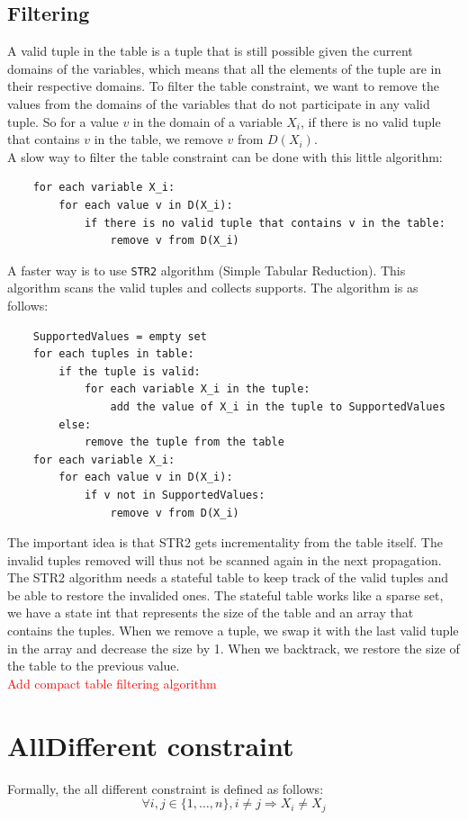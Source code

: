 \documentclass[12pt, openany]{report}
\theoremstyle{definition}
\begin{document}
\subsection{Filtering}
A valid tuple in the table is a tuple that is still possible given the current domains of the variables, which means that all the elements of the tuple are in their respective domains. To filter the table constraint, we want to remove the values from the domains of the variables that do not participate in any valid tuple. So for a value $v$ in the domain of a variable $X_i$, if there is no valid tuple that contains $v$ in the table, we remove $v$ from $D(X_i)$.\\
A slow way to filter the table constraint can be done with this little algorithm:
\begin{lstlisting}    
    for each variable X_i:
        for each value v in D(X_i):
            if there is no valid tuple that contains v in the table:
                remove v from D(X_i)
\end{lstlisting}
A faster way is to use \texttt{STR2} algorithm (Simple Tabular Reduction). This algorithm scans the valid tuples and collects supports. The algorithm is as follows:
\begin{lstlisting}
    SupportedValues = empty set
    for each tuples in table:
        if the tuple is valid:
            for each variable X_i in the tuple:
                add the value of X_i in the tuple to SupportedValues
        else: 
            remove the tuple from the table
    for each variable X_i:
        for each value v in D(X_i):
            if v not in SupportedValues:
                remove v from D(X_i)
\end{lstlisting}
The important idea is that STR2 gets incrementality from the table itself. The invalid tuples removed will thus not be scanned again in the next propagation. The STR2 algorithm needs a stateful table to keep track of the valid tuples and be able to restore the invalided ones. The stateful table works like a sparse set, we have a state int that represents the size of the table and an array that contains the tuples. When we remove a tuple, we swap it with the last valid tuple in the array and decrease the size by 1. When we backtrack, we restore the size of the table to the previous value.\\
\textcolor{red}{Add compact table filtering algorithm}
\section{AllDifferent constraint}
Formally, the all different constraint is defined as follows:
\begin{equation}
    \forall i,j \in \{1, \dots, n\}, i \neq j \Rightarrow X_i \neq X_j
\end{equation}
\end{document}
